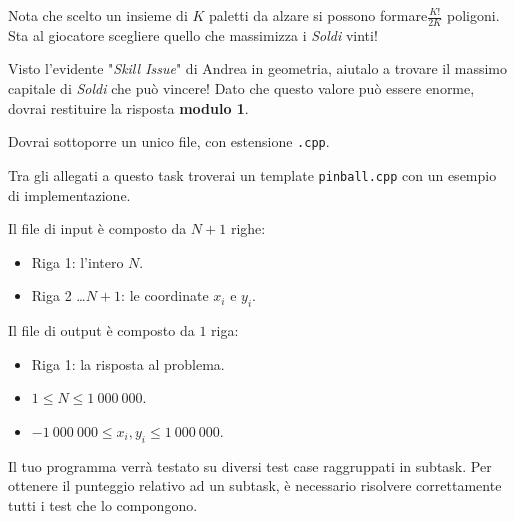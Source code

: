 Nota che scelto un insieme di $K$ paletti da alzare si possono formare$\frac{K!}{2K}$ poligoni.
Sta al giocatore scegliere quello che massimizza i \textit{Soldi} vinti!

Visto l'evidente "\textit{Skill Issue}" di Andrea in geometria, aiutalo a trovare il massimo capitale di \textit{Soldi}
che può vincere! Dato che questo valore può essere enorme, dovrai restituire la risposta \textbf{modulo 1}.

\Implementation

Dovrai sottoporre un unico file, con estensione \texttt{.cpp}.

\begin{warning}
    Tra gli allegati a questo task troverai un template \texttt{pinball.cpp} con un esempio di implementazione.
\end{warning}

Il file di input è composto da $N+1$ righe:
\begin{itemize}
    \item Riga 1: l'intero $N$.
    \item Riga 2 \dots $N+1$: le coordinate $x_i$ e $y_i$.
\end{itemize}

Il file di output è composto da $1$ riga:
\begin{itemize}
    \item Riga 1: la risposta al problema.
\end{itemize}


\Constraints

\begin{itemize}[nolistsep, itemsep=2mm]
    \item $1 \le N \le 1\:000\:000$.
    \item $-1\:000\:000 \le x_i, y_i \le 1\:000\:000$.
\end{itemize}


\Scoring

Il tuo programma verrà testato su diversi test case raggruppati in subtask.
Per ottenere il punteggio relativo ad un subtask,
è necessario risolvere correttamente tutti i test che lo compongono.

